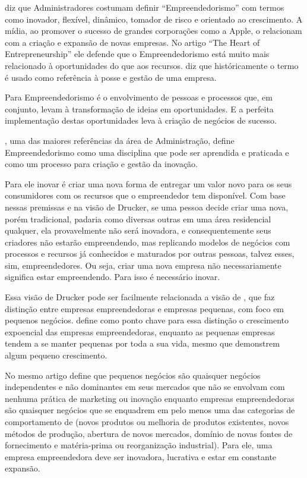  diz que Administradores costumam definir ``Empreendedorismo'' com termos como inovador, flexível, dinâmico, tomador de risco e orientado ao crescimento. A mídia, ao promover o sucesso de grandes corporações como a Apple, o relacionam com a criação e expansão de novas empresas. No artigo ``The Heart of Entrepreneurship'' ele defende que o Empreendedorismo está muito mais relacionado à oportunidades do que aos recursos.  diz que históricamente o termo é usado como referência à posse e gestão de uma empresa.

Para  Empreendedorismo é o envolvimento de pessoas e processos que, em conjunto, levam à transformação de ideias em oportunidades. E a perfeita implementação destas oportunidades leva à criação de negócios de sucesso.

, uma das maiores referências da área de Administração, define Empreendedorismo como uma disciplina que pode ser aprendida e praticada e como um processo para criação e gestão da inovação. 

Para ele inovar é criar uma nova forma de entregar um valor novo para os seus consumidores com os recursos que o empreendedor tem disponível. Com base nessas premissas e na visão de Drucker, se uma pessoa decide criar uma nova, porém tradicional, padaria como diversas outras em uma área residencial qualquer, ela provavelmente não será inovadora, e consequentemente seus criadores não estarão empreendendo, mas replicando modelos de negócios com processos e recursos já conhecidos e maturados por outras pessoas, talvez esses, sim, empreendedores. Ou seja, criar uma nova empresa não necessariamente significa estar empreendendo. Para isso é necessário inovar. 

Essa visão de Drucker pode ser facilmente relacionada a visão de , que faz distinção entre empresas empreendedoras e empresas pequenas, com foco em pequenos negócios.  define como ponto chave para essa distinção o crescimento expoencial das empresas empreendedoras, enquanto as pequenas empresas tendem a se manter pequenas por toda a sua vida, mesmo que demonstrem algum pequeno crescimento. 

No mesmo artigo  define que pequenos negócios são quaisquer negócios independentes e não dominantes em seus mercados que não se envolvam com nenhuma prática de marketing ou inovação enquanto empresas empreendedoras são quaisquer negócios que se enquadrem em pelo menos uma das categorias de comportamento de  (novos produtos ou melhoria de produtos existentes, novos métodos de produção, abertura de novos mercados, domínio de novas fontes de fornecimento e matéria-prima ou reorganização industrial). Para ele, uma empresa empreendedora deve ser inovadora, lucrativa e estar em constante expansão.

